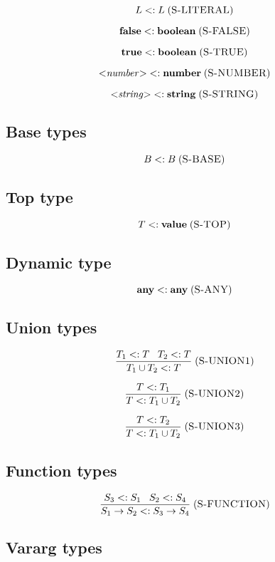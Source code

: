 \documentclass[12pt]{article}
\newcommand{\Top}{\mathbf{value}}
\newcommand{\Any}{\mathbf{any}}
\newcommand{\False}{\mathbf{false}}
\newcommand{\True}{\mathbf{true}}
\newcommand{\Boolean}{\mathbf{boolean}}
\newcommand{\Number}{\mathbf{number}}
\newcommand{\String}{\mathbf{string}}
\newcommand{\mylabel}[1]{\; (\textsc{#1})}
\newcommand{\subtype}{<:}
\begin{document}
\[
L \subtype L
\mylabel{S-LITERAL}
\]

\[
\False \subtype \Boolean
\mylabel{S-FALSE}
\]

\[
\True \subtype \Boolean
\mylabel{S-TRUE}
\]

\[
{<}{\it number}{>} \subtype \Number
\mylabel{S-NUMBER}
\]

\[
{<}{\it string}{>} \subtype \String
\mylabel{S-STRING}
\]

\subsection{Base types}

\[
B \subtype B
\mylabel{S-BASE}
\]

\subsection{Top type}

\[
T \subtype \Top
\mylabel{S-TOP}
\]

\subsection{Dynamic type}

\[
\Any \subtype \Any
\mylabel{S-ANY}
\]

\subsection{Union types}

\[
\frac{T_{1} \subtype T \;\;\; T_{2} \subtype T}
     {T_{1} \cup T_{2} \subtype T}
\mylabel{S-UNION1}
\]

\[
\frac{T \subtype T_{1}}
     {T \subtype T_{1} \cup T_{2}}
\mylabel{S-UNION2}
\]

\[
\frac{T \subtype T_{2}}
     {T \subtype T_{1} \cup T_{2}}
\mylabel{S-UNION3}
\]

\subsection{Function types}

\[
\frac{S_{3} \subtype S_{1} \;\;\; S_{2} \subtype S_{4}}
     {S_{1} \rightarrow S_{2} \subtype S_{3} \rightarrow S_{4}}
\mylabel{S-FUNCTION}
\]

\subsection{Vararg types}
\end{document}

